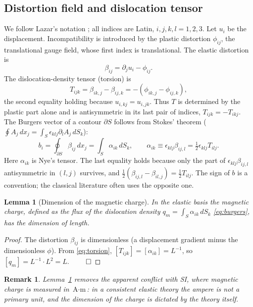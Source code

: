 \documentclass[12pt,a4paper]{article}
\newtheorem{lemma}{Lemma}
\newtheorem{remark}{Remark}
\begin{document}
\subsection{Distortion field and dislocation tensor}
We follow Lazar's notation \cite{lazar2010pla}; all indices are Latin,
$i,j,k,l=1,2,3$. Let $u_i$ be the displacement. Incompatibility is introduced by
the plastic distortion $\phi_{ij}$, the translational gauge field, whose first index
is translational. The elastic distortion is
\begin{equation}
\beta_{ij}=\partial_ju_i-\phi_{ij}.
\label{eq:beta}
\end{equation}
The dislocation-density tensor (torsion) is
\begin{equation}
T_{ijk}=\beta_{ik,j}-\beta_{ij,k}=-\left(\phi_{ik,j}-\phi_{ij,k}\right),
\label{eq:torsion}
\end{equation}
the second equality holding because $u_{i,kj}=u_{i,jk}$. Thus $T$ is determined by
the plastic part alone and is antisymmetric in its last pair of indices,
$T_{ijk}=-T_{ikj}$. The Burgers vector of a contour $\partial S$ follows from
Stokes' theorem ($\oint A_j\,dx_j=\int_S\epsilon_{klj}\partial_lA_j\,dS_k$):
\begin{equation}
b_i=\oint_{\partial S}\beta_{ij}\,dx_j=\int_S\alpha_{ik}\,dS_k,\qquad
\alpha_{ik}\equiv\epsilon_{klj}\beta_{ij,l}=\tfrac12\epsilon_{klj}T_{ilj}.
\label{eq:burgers}
\end{equation}
Here $\alpha_{ik}$ is Nye's tensor. The last equality holds because only the part of
$\epsilon_{klj}\beta_{ij,l}$ antisymmetric in $(l,j)$ survives, and
$\tfrac12(\beta_{ij,l}-\beta_{il,j})=\tfrac12T_{ilj}$. The sign of $b$ is a convention;
the classical literature \cite{hirth1982} often uses the opposite one.

\begin{lemma}[Dimension of the magnetic charge]
\label{lem:qm}
In the elastic basis the magnetic charge, defined as the flux of the dislocation
density $q_m=\int_S\alpha_{ik}\,dS_k$ \eqref{eq:burgers}, has the dimension of length.
\end{lemma}
\begin{proof}
The distortion $\beta_{ij}$ is dimensionless (a displacement gradient minus the
dimensionless $\phi$). From \eqref{eq:torsion}, $[T_{ijk}]=[\alpha_{ik}]=L^{-1}$, so
$[q_m]=L^{-1}\cdot L^{2}=L$. $\qed$
\end{proof}

\begin{remark}
Lemma~\ref{lem:qm} removes the apparent conflict with SI, where magnetic charge is
measured in $\text{A}\cdot\text{m}$: in a consistent elastic theory the ampere is
not a primary unit, and the dimension of the charge is dictated by the theory itself.
\end{remark}
\end{document}

